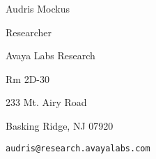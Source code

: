\documentclass[margin,line,article,letterpaper]{res}
\newenvironment{list1}{
  \begin{list}{}{%
      \setlength{\itemsep}{0in}
      \setlength{\parsep}{0in} \setlength{\parskip}{0in}
      \setlength{\topsep}{0in} \setlength{\partopsep}{0in} 
      \setlength{\leftmargin}{0.17in}}}{\end{list}}
\begin{document}
\begin{resume}
Audris Mockus
\begin{list1}
\item Researcher
\item Avaya Labs Research
\item Rm 2D-30
\item 233 Mt. Airy Road
\item Basking Ridge, NJ 07920
\item \texttt{audris@research.avayalabs.com}
\end{list1}

\end{resume}
\end{document}
